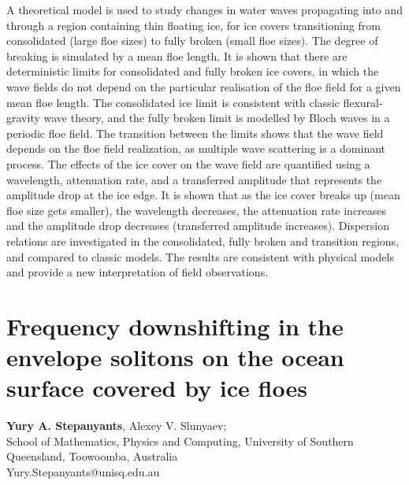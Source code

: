 \documentclass[9pt,a4paper,oneside]{book}
\numberwithin{equation}{section}
\begin{document}
A theoretical model is used to study changes in water waves propagating into and through a region containing thin floating ice, for ice covers transitioning from consolidated (large floe sizes) to fully broken (small floe sizes). The degree of breaking is simulated by a mean floe length. It is shown that there are deterministic limits for consolidated and fully broken ice covers, in which the wave fields do not depend on the particular realisation of the floe field for a given mean floe length. The consolidated ice limit is consistent with classic flexural-gravity wave theory, and the fully broken limit is modelled by Bloch waves in a periodic floe field. The transition between the limits shows that the wave field depends on the floe field realization, as multiple wave scattering is a dominant process. The effects of the ice cover on the wave field are quantified using a wavelength, attenuation rate, and a transferred amplitude that represents the amplitude drop at the ice edge. It is shown that as the ice cover breaks up (mean floe size gets smaller), the wavelength decreases, the attenuation rate increases and the amplitude drop decreases (transferred amplitude increases). Dispersion relations are investigated in the consolidated, fully broken and transition regions, and compared to classic models. The results are consistent with physical models and provide a new interpretation of field observations.

\section*{Frequency downshifting in the envelope solitons on the ocean surface covered by ice floes}
 \label{abs:5}
  {\bf Yury A. Stepanyants}, Alexey V. Slunyaev;\\
School of Mathematics, Physics and Computing, University of Southern Queensland, Toowoomba, Australia\\
Yury.Stepanyants@unisq.edu.au\\
\end{document}
